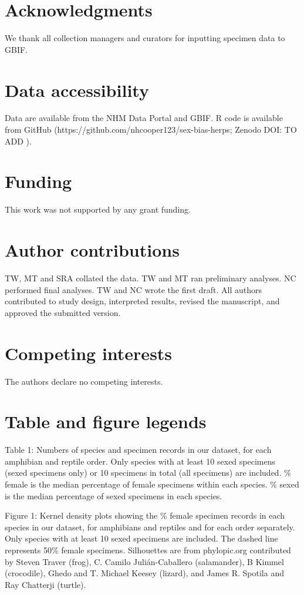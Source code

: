 \documentclass[a4paper, 12pt]{article}
\begin{document}
\section{Acknowledgments}
We thank all collection managers and curators for inputting specimen data to GBIF.

\section{Data accessibility}\label{data-code-and-materials}
Data are available from the NHM Data Portal\cite{herp-data} and GBIF\cite{gbif-amphibians,gbif-reptiles}. 
R code is available from GitHub (https://github.com/nhcooper123/sex-bias-herps; Zenodo DOI: TO ADD \cite{herp-code2022}).

\section{Funding}
This work was not supported by any grant funding.

\section{Author contributions}
TW, MT and SRA collated the data. TW and MT ran preliminary analyses. NC performed final analyses. TW and NC wrote the first draft. All authors contributed to study design, interpreted results, revised the manuscript, and approved the submitted version.

\section{Competing interests}
The authors declare no competing interests.




\newpage
\section{Table and figure legends}

Table 1: Numbers of species and specimen records in our dataset, for each amphibian and reptile order. Only species with at least 10 sexed specimens (sexed specimens only) or 10 specimens in total (all specimens) are included. \% female is the median percentage of female specimens within each species. \% sexed is the median percentage of sexed specimens in each species.

Figure 1: Kernel density plots showing the \% female specimen records in each species in our dataset, for amphibians and reptiles and for each order separately. Only species with at least 10 sexed specimens are included. The dashed line represents 50\% female specimens. Silhouettes are from phylopic.org contributed by Steven Traver (frog), C. Camilo Julián-Caballero (salamander), B Kimmel (crocodile), Ghedo and T. Michael Keesey (lizard), and James R. Spotila and Ray Chatterji (turtle).
\end{document}
